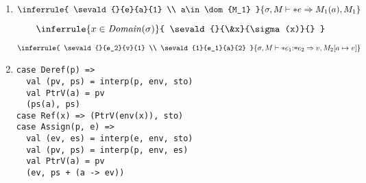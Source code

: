 \textbf{}
\begin{enumerate}
    \item
\[
  \inferrule
  { \sevald{}{e}{a}{1} \\ a\in\dom{M_1} }
  { \sevald{}{\ast e}{M_1(a)}{1} }
\]

\[
  \inferrule
  { x\in\dom{\sigma} }
  { \sevald{}{\&x}{\sigma(x)}{} }
\]

\[
  \inferrule
  { \sevald{}{e_2}{v}{1} \\ \sevald{1}{e_1}{a}{2} }
  { \seval{\sigma}{M}{\ast\eset{e_1}{e_2}}{v}{M_2[a\mapsto v]} }
\]
\item
\begin{verbatim}
case Deref(p) =>
  val (pv, ps) = interp(p, env, sto)
  val PtrV(a) = pv
  (ps(a), ps)
case Ref(x) => (PtrV(env(x)), sto)
case Assign(p, e) =>
  val (ev, es) = interp(e, env, sto)
  val (pv, ps) = interp(p, env, es)
  val PtrV(a) = pv
  (ev, ps + (a -> ev))
\end{verbatim}
\end{enumerate}

